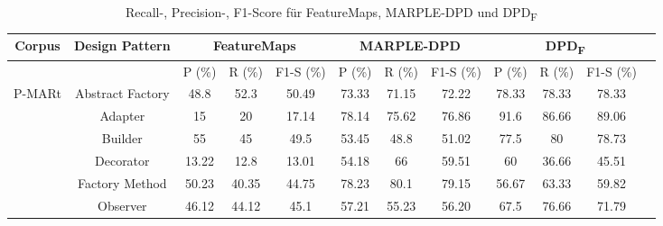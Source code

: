 \documentclass[conference]{IEEEtran}
\begin{document}
\begin{table}
    \caption{Recall-, Precision-, F1-Score für FeatureMaps, MARPLE-DPD und DPD\textsubscript{F}}
    \label{table:8}
    \begin{tabular}{|c|c|c|c|c|c|c|c|c|c|c|c|}
        \hline
        Corpus                                       & Design Pattern   & \multicolumn{3}{|c|}{FeatureMaps} & \multicolumn{3}{|c|}{MARPLE-DPD} & \multicolumn{3}{|c|}{DPD\textsubscript{F}}                                                             \\
        \hline
                                                     &                  & P (\%)                            & R (\%)                           & F1-S (\%)                                  & P (\%) & R (\%) & F1-S (\%) & P (\%) & R (\%) & F1-S (\%) \\
        \hline
        \multirow{9}{*}{P-MARt}                      & Abstract Factory & 48.8                              & 52.3                             & 50.49                                      & 73.33  & 71.15  & 72.22     & 78.33  & 78.33  & 78.33     \\
                                                     & Adapter          & 15                                & 20                               & 17.14                                      & 78.14  & 75.62  & 76.86     & 91.6   & 86.66  & 89.06     \\
                                                     & Builder          & 55                                & 45                               & 49.5                                       & 53.45  & 48.8   & 51.02     & 77.5   & 80     & 78.73     \\
                                                     & Decorator        & 13.22                             & 12.8                             & 13.01                                      & 54.18  & 66     & 59.51     & 60     & 36.66  & 45.51     \\
                                                     & Factory Method   & 50.23                             & 40.35                            & 44.75                                      & 78.23  & 80.1   & 79.15     & 56.67  & 63.33  & 59.82     \\
                                                     & Observer         & 46.12                             & 44.12                            & 45.1                                       & 57.21  & 55.23  & 56.20     & 67.5   & 76.66  & 71.79     \\

\end{tabular}
\end{table}
\end{document}
